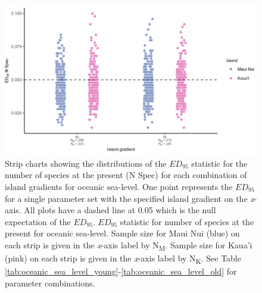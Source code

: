 \begin{figure}
    \centering
    \includegraphics[width=\textwidth]{JBI-21-0508_FigS11.png}
    \caption{Strip charts showing the distributions of the $ED_{95}$ statistic for the number of species at the present (N Spec) for each combination of island gradients for oceanic sea-level. One point represents the $ED_{95}$ for a single parameter set with the specified island gradient on the \textit{x}-axis. All plots have a dashed line at 0.05 which is the null expectation of the $ED_{95}$. $ED_{95}$ statistic for number of species at the present for oceanic sea-level. Sample size for Maui Nui (blue) on each strip is given in the \textit{x}-axis label by N\textsubscript{M}. Sample size for Kaua'i (pink) on each strip is given in the \textit{x}-axis label by N\textsubscript{K}. See Table \ref{tab:oceanic_sea_level_young}-\ref{tab:oceanic_sea_level_old} for parameter combinations.}
    \label{fig:Island_gradient_sea_level_num_spec}
\end{figure}

